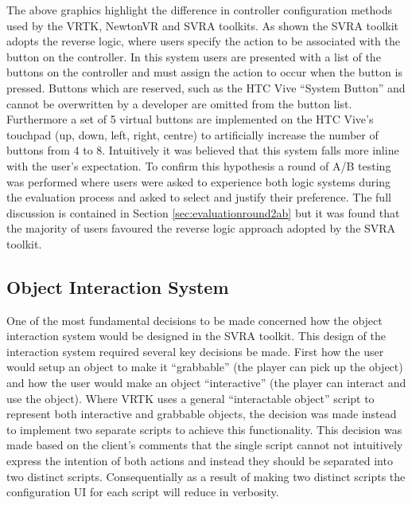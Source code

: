 \documentclass{l4proj}
\begin{document}
The above graphics highlight the difference in controller configuration methods used by the VRTK, NewtonVR and SVRA toolkits. As shown the SVRA toolkit adopts the reverse logic, where users specify the action to be associated with the button on the controller. In this system users are presented with a list of the buttons on the controller and must assign the action to occur when the button is pressed. Buttons which are reserved, such as the HTC Vive ``System Button'' and cannot be overwritten by a developer are omitted from the button list. Furthermore a set of 5 virtual buttons are implemented on the HTC Vive's touchpad (up, down, left, right, centre) to artificially increase the number of buttons from 4 to 8. Intuitively it was believed that this system falls more inline with the user's expectation. To confirm this hypothesis a round of A/B testing was performed where users were asked to experience both logic systems during the evaluation process and asked to select and justify their preference. The full discussion is contained in Section \ref{sec:evaluationround2ab} but it was found that the majority of users favoured the reverse logic approach adopted by the SVRA toolkit.

\subsection{Object Interaction System}
\label{sec:decisionobjectinteractiondesign}
One of the most fundamental decisions to be made concerned how the object interaction system would be designed in the SVRA toolkit. This design of the interaction system required several key decisions be made. First how the user would setup an object to make it ``grabbable'' (the player can pick up the object) and how the user would make an object ``interactive'' (the player can interact and use the object). Where VRTK uses a general ``interactable object'' script to represent both interactive and grabbable objects, the decision was made instead to implement two separate scripts to achieve this functionality. This decision was made based on the client’s comments that the single script cannot not intuitively express the intention of both actions and instead they should be separated into two distinct scripts. Consequentially as a result of making two distinct scripts the configuration UI for each script will reduce in verbosity.  
\end{document}

